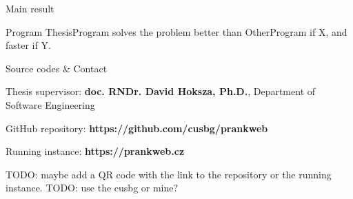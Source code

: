 \documentclass[portrait,a0paper,fontscale=0.25]{baposter}
\begin{document}
\begin{poster}
\begin{posterbox}[column=1, name=result3, below=result2, headerColorOne=green!50!yellow, boxColorOne=green!10]{Main result}
\large\bfseries
\vspace{1ex}
\begin{center}
Program ThesisProgram solves the problem better than OtherProgram if X, and faster if Y.
\end{center}
\vspace{.5ex}
\end{posterbox}

\begin{posterbox}[column=1, name=conclusion, below=result3, bottomaligned=tech]{Source codes \& Contact}

Thesis supervisor: \textbf{doc. RNDr. David Hoksza, Ph.D.}, Department of Software Engineering

GitHub repository: \textbf{https://github.com/cusbg/prankweb}

Running instance: \textbf{https://prankweb.cz}


TODO: maybe add a QR code with the link to the repository or the running instance.
TODO: use the cusbg or mine?
\end{posterbox}

\end{poster}
\end{document}
